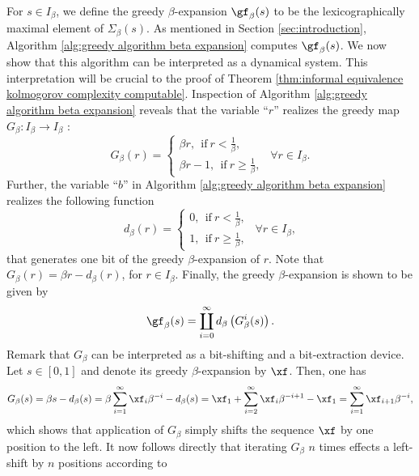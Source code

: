 For $s \in I_\beta$, we define the greedy $\beta$-expansion $\gf_\beta(s)$ to be the lexicographically maximal element of $\Sigma_\beta(s)$. As mentioned in Section \ref{sec:introduction}, Algorithm \ref{alg:greedy algorithm beta expansion} computes $\gf_\beta(s)$. We now show that this algorithm can be interpreted as a dynamical system. This interpretation will be crucial to the proof of Theorem \ref{thm:informal equivalence kolmogorov complexity computable}. Inspection of Algorithm \ref{alg:greedy algorithm beta expansion} reveals that the variable ``$r$'' realizes the greedy map $G_\beta : I_\beta \to I_\beta$ \cite[Section 1, p.2]{baker2015induced}:
\begin{equation}\label{eq:greedy map}
	G_\beta (r) = \begin{cases}
		\beta r, \ \ \text{if} \ r < \frac{1}{\beta},\\
		\beta r - 1, \ \ \text{if} \ r \geq \frac{1}{\beta}, 
	\end{cases} \ \ \forall r \in I_\beta.
\end{equation}
Further, the variable ``$b$'' in Algorithm \ref{alg:greedy algorithm beta expansion} realizes the following function
\begin{equation}
	d_{\beta}  (r) = \begin{cases}
		0, \ \ \text{if} \ r < \frac{1}{\beta},\\
		1, \ \ \text{if} \ r \geq \frac{1}{\beta}, 
	\end{cases} \ \ \forall r \in I_\beta,
\end{equation}
that generates one bit of the greedy $\beta$-expansion of $r$. Note that $G_\beta(r) = \beta r - d_\beta(r)$, for $r \in I_\beta$. Finally, the greedy $\beta$-expansion is shown to be given by
\begin{equation}\label{eq:greedy beta exp as digit + iterative map}
	\gf_\beta(s) = \coprod_{i=0}^\infty d_{\beta}\left(G_\beta^{i}(s)\right).
\end{equation}
Remark that $G_\beta$ can be interpreted as a bit-shifting and a bit-extraction device. Let $s \in [0,1]$ and denote its greedy $\beta$-expansion by $\xf$. Then, one has 
\begin{equation}
	G_\beta(s) = \beta s - d_\beta(s) = \beta \sum_{i=1}^\infty \xf_i \beta^{-i} - d_\beta(s) = \xf_1 + \sum_{i=2}^\infty \xf_i \beta^{-i+1} - \xf_1 = \sum_{i=1}^\infty \xf_{i+1} \beta^{-i},
\end{equation}
which shows that application of $G_\beta$ simply shifts the sequence $\xf$ by one position to the left. It now follows directly that iterating $G_\beta$ $n$ times effects a left-shift by $n$ positions according to 
